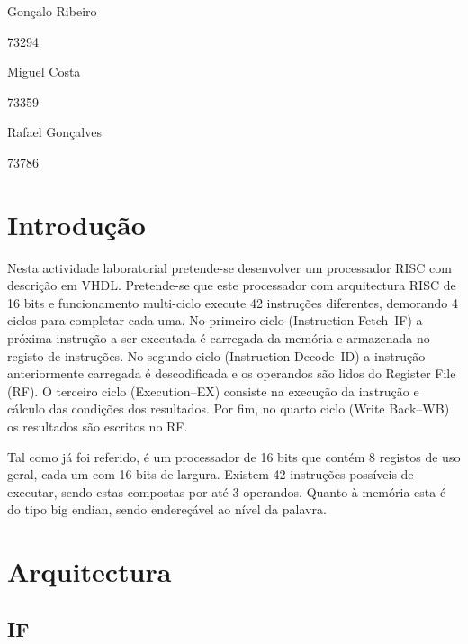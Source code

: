 \documentclass[a4paper]{article}
\begin{document}
	
	
	
	\trSetAuthors
		{
		Gonçalo Ribeiro
		
		73294
		}{
		Miguel Costa
		
		73359
		}{
		Rafael Gonçalves
		
		73786
		}
	
	
	\trMakeCover
	
	\tableofcontents
	\pagebreak
	
	\section{Introdução}
	
		Nesta actividade laboratorial pretende-se desenvolver um processador \textmu RISC com descrição em VHDL. Pretende-se que este processador com arquitectura RISC de 16 bits e funcionamento multi-ciclo execute 42 instruções diferentes, demorando 4 ciclos para completar cada uma. No primeiro ciclo (Instruction Fetch--IF) a próxima instrução a ser executada é carregada da memória e armazenada no registo de instruções. No segundo ciclo (Instruction Decode--ID) a instrução anteriormente carregada é descodificada e os operandos são lidos do Register File (RF). O terceiro ciclo (Execution--EX) consiste na execução da instrução e cálculo das condições dos resultados. Por fim, no quarto ciclo (Write Back--WB) os resultados são escritos no RF.
	
		Tal como já foi referido, é um processador de 16 bits que contém 8 registos de uso geral, cada um com 16 bits de largura. Existem 42 instruções possíveis de executar, sendo estas compostas por até 3 operandos. Quanto à memória esta é do tipo big endian, sendo endereçável ao nível da palavra.
	
	
	\section{Arquitectura}
	
		\subsection{IF}
\end{document}
